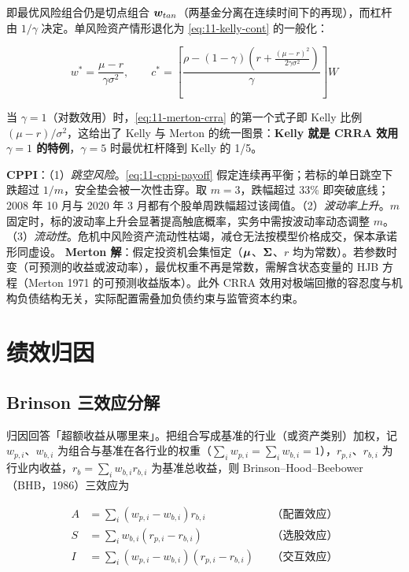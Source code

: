 即最优风险组合仍是切点组合 $\bm{w}_{tan}$（两基金分离在连续时间下的再现），而杠杆由 $1/\gamma$ 决定。单风险资产情形退化为 \cref{eq:11-kelly-cont} 的一般化：

\begin{equation}\label{eq:11-merton-crra}
  w^{*} = \frac{\mu - r}{\gamma\sigma^{2}},
  \qquad
  c^{*} = \left[\frac{\rho - (1-\gamma)\left(r + \frac{(\mu-r)^{2}}{2\gamma\sigma^{2}}\right)}{\gamma}\right]W
\end{equation}

当 $\gamma = 1$（对数效用）时，\cref{eq:11-merton-crra} 的第一个式子即 Kelly 比例 $(\mu-r)/\sigma^{2}$，这给出了 Kelly 与 Merton 的统一图景：\textbf{Kelly 就是 CRRA 效用 $\gamma = 1$ 的特例}，$\gamma = 5$ 时最优杠杆降到 Kelly 的 1/5。

\begin{warningbox}
\textbf{CPPI}：（1）\emph{跳空风险}。\cref{eq:11-cppi-payoff} 假定连续再平衡；若标的单日跳空下跌超过 $1/m$，安全垫会被一次性击穿。取 $m = 3$，跌幅超过 33\% 即突破底线；2008 年 10 月与 2020 年 3 月都有个股单周跌幅超过该阈值。（2）\emph{波动率上升}。$m$ 固定时，标的波动率上升会显著提高触底概率，实务中需按波动率动态调整 $m$。（3）\emph{流动性}。危机中风险资产流动性枯竭，减仓无法按模型价格成交，保本承诺形同虚设。
\textbf{Merton 解}：假定投资机会集恒定（$\bm{\mu}$、$\bm{\Sigma}$、$r$ 均为常数）。若参数时变（可预测的收益或波动率），最优权重不再是常数，需解含状态变量的 HJB 方程（Merton 1971 的可预测收益版本）。此外 CRRA 效用对极端回撤的容忍度与机构负债结构无关，实际配置需叠加负债约束与监管资本约束。
\end{warningbox}

\section{绩效归因}

\subsection{Brinson 三效应分解}

归因回答「超额收益从哪里来」。把组合写成基准的行业（或资产类别）加权，记 $w_{p,i}$、$w_{b,i}$ 为组合与基准在各行业的权重（$\sum_i w_{p,i} = \sum_i w_{b,i} = 1$），$r_{p,i}$、$r_{b,i}$ 为行业内收益，$r_b = \sum_i w_{b,i}r_{b,i}$ 为基准总收益，则 Brinson--Hood--Beebower（BHB，1986）三效应为

\begin{align}\label{eq:11-brinson}
  A &= \sum_{i}\left(w_{p,i} - w_{b,i}\right)r_{b,i}
  && \text{（配置效应）}\\
  S &= \sum_{i} w_{b,i}\left(r_{p,i} - r_{b,i}\right)
  && \text{（选股效应）}\\
  I &= \sum_{i}\left(w_{p,i} - w_{b,i}\right)\left(r_{p,i} - r_{b,i}\right)
  && \text{（交互效应）}
\end{align}

